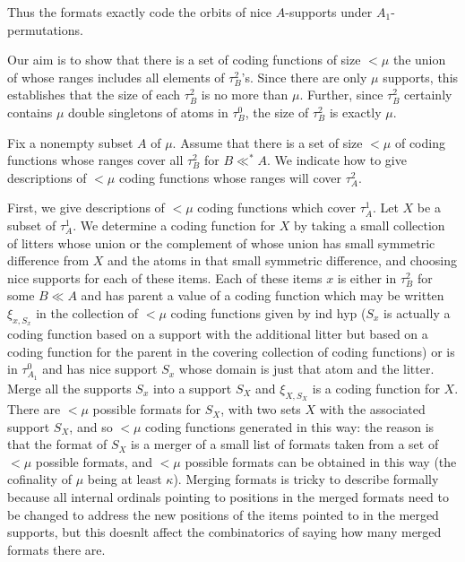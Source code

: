 \documentclass[12pt]{article}
\begin{document}
Thus the formats exactly code the orbits of nice $A$-supports under $A_1$-permutations.

Our aim is to show that there is a set of coding functions of size $<\mu$ the union of whose ranges includes all elements of $\tau^2_B$'s.  Since there are only $\mu$ supports,
this establishes that the size of each $\tau^2_B$ is no more than $\mu$.  Further, since $\tau^2_B$ certainly contains $\mu$ double singletons of atoms in $\tau^0_B$,
the size of $\tau^2_B$ is exactly $\mu$.

Fix a nonempty subset $A$ of $\mu$.  Assume that there is a set of size $<\mu$ of coding functions whose ranges cover all $\tau^2_B$ for $B \ll^* A$.  We indicate how to give
descriptions of $<\mu$ coding functions whose ranges will cover $\tau^2_A$.  

First, we give descriptions of $<\mu$ coding functions which cover $\tau^1_A$.   Let $X$ be a subset
of $\tau^1_A$.  We determine a coding function for $X$ by taking a small collection of litters whose union or the complement of whose union has small symmetric difference from $X$
and the atoms in that small symmetric difference, and choosing nice supports for each of these items.  Each of these items $x$ is either in $\tau^2_B$ for some $B \ll A$ and
has parent a value of a coding function which may be written $\xi_{x,S_x}$ in the collection of $<\mu$ coding functions given by ind hyp ($S_x$ is actually a coding function based on a support with the additional litter but based on a coding function for the parent in the covering collection of coding functions)  or is in $\tau^0_{A_1}$ and has nice support $S_x$ whose
domain is just that atom and the litter.  Merge all the supports $S_x$ into a support $S_X$ and $\xi_{X,S_X}$ is a coding function for $X$.  There are $<\mu$ possible formats for $S_X$, with two sets $X$ with the associated  support $S_X$, and so
$<\mu$ coding functions generated in this way:  the reason is that the format of $S_X$ is a merger of a small list of formats taken from a set of $<\mu$ possible formats,
and $<\mu$ possible formats can be obtained in this way (the cofinality of $\mu$ being at least $\kappa$).  Merging formats is tricky to describe formally because all internal
ordinals pointing to positions in the merged formats need to be changed to address the new positions of the items pointed to in the merged supports, but this doesnlt affect the combinatorics of saying how many merged formats there are.
\end{document}
